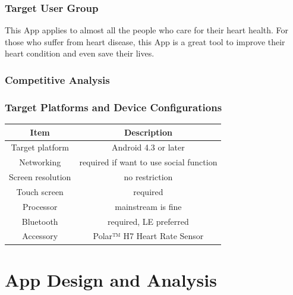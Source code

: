 \documentclass[10pt,a4paper,final]{scrartcl}
\begin{document}
\subsubsection{Target User Group}
This App applies to almost all the people who care for their heart health. For those who suffer from heart disease, this App is a great tool to improve their heart condition and even save their lives. 
\subsubsection{Competitive Analysis}

\subsubsection{Target Platforms and Device Configurations}
\begin{tabular}{|c|c|}
\hline 
Item & Description \\ 
\hline 
Target platform & Android 4.3 or later \\
Networking & required if want to use social function \\
Screen resolution & no restriction \\
Touch screen & required \\
Processor & mainstream is fine \\
Bluetooth & required, LE preferred \\
Accessory & Polar™ H7 Heart Rate Sensor \\
\hline 
\end{tabular} 
\section{App Design and Analysis}
\end{document}
